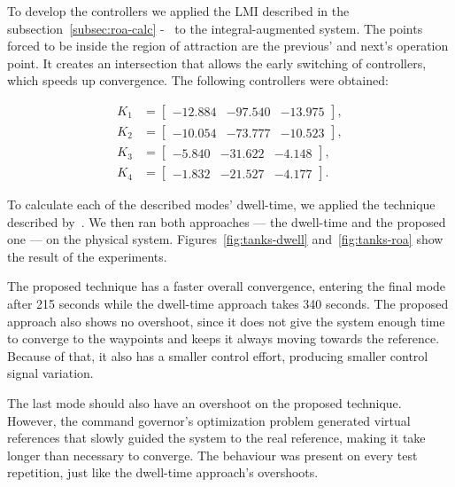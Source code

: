 To develop the controllers we applied the LMI described in the
subsection~\ref{subsec:roa-calc}
-~ to the integral-augmented system. The
points forced to be inside the region of attraction are the previous' and next's
operation point. It creates an intersection that allows the early switching of
controllers, which speeds up convergence. The following controllers were
obtained:

\begin{align}
	K_{1} & = \begin{bmatrix} -12.884 & -97.540 & -13.975 \end{bmatrix}, \\
	K_{2} & = \begin{bmatrix} -10.054 & -73.777 & -10.523 \end{bmatrix}, \\
	K_{3} & = \begin{bmatrix} -5.840 & -31.622 & -4.148 \end{bmatrix}, \\
	K_{4} & = \begin{bmatrix} -1.832 & -21.527 & -4.177 \end{bmatrix}.
\end{align}

To calculate each of the described modes' dwell-time, we applied the technique
described by~\textcite{franzè.lucia.ea:command}. We then ran both approaches ---
the dwell-time and the proposed one --- on the physical system.
Figures~\ref{fig:tanks-dwell} and~\ref{fig:tanks-roa} show the result of the
experiments.

The proposed technique has a faster overall convergence, entering the final mode
after 215 seconds while the dwell-time approach takes 340 seconds. The proposed
approach also shows no overshoot, since it does not give the system enough time
to converge to the waypoints and keeps it always moving towards the reference.
Because of that, it also has a smaller control effort, producing smaller control
signal variation.

The last mode should also have an overshoot on the proposed technique. However,
the command governor's optimization problem generated virtual references that
slowly guided the system to the real reference, making it take longer than
necessary to converge. The behaviour was present on every test repetition, just
like the dwell-time approach's overshoots.

